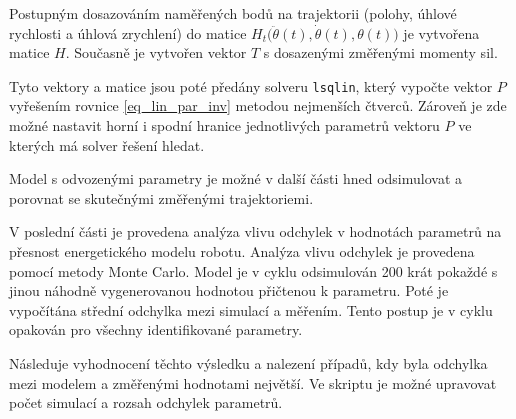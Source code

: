 Postupným dosazováním naměřených bodů na trajektorii (polohy, úhlové rychlosti a úhlová zrychlení) do matice $H_t\big(\ddot{\theta}(t),\dot{\theta}(t),\theta(t)\big)$ je vytvořena matice $H$. Současně je vytvořen vektor $T$ s dosazenými změřenými momenty sil.

Tyto vektory a matice jsou poté předány solveru \texttt{lsqlin}, který vypočte vektor $P$ vyřešením rovnice \ref{eq_lin_par_inv} metodou nejmenších čtverců. Zároveň je zde možné nastavit horní i spodní hranice jednotlivých parametrů vektoru $P$ ve kterých má solver řešení hledat.

Model s odvozenými parametry je možné v další části hned odsimulovat a porovnat se skutečnými změřenými trajektoriemi.

V poslední části je provedena analýza vlivu odchylek v hodnotách parametrů na přesnost energetického modelu robotu. Analýza vlivu odchylek je provedena pomocí metody Monte Carlo. Model je v cyklu odsimulován 200 krát pokaždé s jinou náhodně vygenerovanou hodnotou přičtenou k parametru. Poté je vypočítána střední odchylka mezi simulací a měřením. Tento postup je v cyklu opakován pro všechny identifikované parametry. 

Následuje vyhodnocení těchto výsledku a nalezení případů, kdy byla odchylka mezi modelem a změřenými hodnotami největší. Ve skriptu je možné upravovat počet simulací a rozsah odchylek parametrů.  

